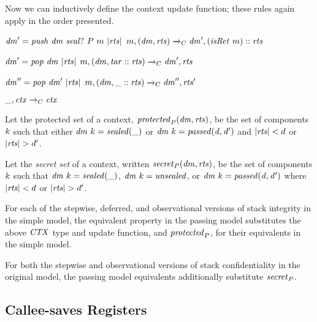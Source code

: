 \documentclass[acmsmall,review,anonymous]{acmart}\settopmatter{printfolios=true,printccs=false,printacmref=false}
\begin{document}
{Now we can inductively define the context update function; these rules again apply in the order
presented. \ifspace{}\fi

            {\(\mathit{dm}' = \mathit{push} ~ \mathit{dm} ~ \mathit{seal?} ~ P ~ m ~ |\mathit{rts}|\)}
            {\(m,(\mathit{dm},\mathit{rts}) \xrightarrow{}_C \mathit{dm}',(\mathit{isRet} ~ m)::\mathit{rts}\)}

\vspace*{-1ex}
            {\(\mathit{dm}' = \mathit{pop} ~ \mathit{dm} ~ |\mathit{rts}|\)}
            {\(m,(\mathit{dm},\mathit{tar}::\mathit{rts}) \xrightarrow{}_C \mathit{dm}',\mathit{rts}\)}

\vspace*{-1ex}
              {\(\mathit{dm}'' = \mathit{pop} ~ \mathit{dm}' ~ |\mathit{rts}|\)}
              {\(m,(\mathit{dm},\mbox{\_}::\mathit{rts}) \xrightarrow{}_C \mathit{dm}'',\mathit{rts}'\)}

\vspace*{-5ex}
\judgment[ Default]
         {}
         {\(\mbox{\_},\mathit{ctx} \xrightarrow{}_C \mathit{ctx}\)}

 Let the protected set of a context, \(\mathit{protected}_P(\mathit{dm},\mathit{rts})\),
be the set of components \(k\) such that either \(\mathit{dm} ~ k = \mathit{sealed(\mbox{\_})}\)
or \(\mathit{dm} ~ k = \mathit{passed(d,d')}\) and \(|\mathit{rts}| < d\) or
\(|\mathit{rts}| > d'\).

 Let the \emph{secret set} of a context, written \(\mathit{secret}_P(\mathit{dm},\mathit{rts})\),
be the set of components \(k\) such that
\(\mathit{dm} ~ k = \mathit{sealed(\mbox{\_})}\), \(\mathit{dm} ~ k = \mathit{unsealed}\), or
\(\mathit{dm} ~ k = \mathit{passed(d,d')}\)
where \(|\mathit{rts}| < d\) or \(|\mathit{rts}| > d'\).

For each of the stepwise, deferred, and observational versions of
stack integrity in the simple model, the equivalent property in the
passing model substitutes the above \(\mathit{CTX}\) type and update
function, and \(\mathit{protected}_P\), for their equivalents in the simple model.

For both the stepwise and observational versions of stack confidentiality in
the original model, the passing model equivalents additionally substitute \(\mathit{secret}_P\).

\subsection{Callee-saves Registers}

}
\end{document}
